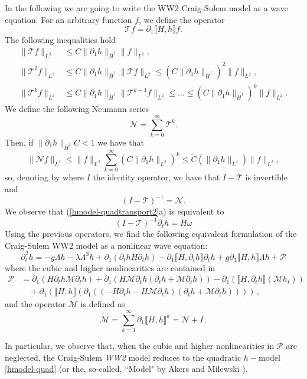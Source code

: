 \documentclass[11pt]{article}
\theoremstyle{plain}
\theoremstyle{definition}
\theoremstyle{definition}
\def\bp{{\partial_1}}
\def\comm#1#2{{\llbracket#1,#2\rrbracket}}
\begin{document}
In the following we are going to write the WW2 Craig-Sulem model as a wave equation. For an arbitrary function $f$, we define the operator
$$
\mathscr{T}f=\partial_1\comm{H}{h}f.
$$
The following inequalities hold
\begin{align*}
\|\mathscr{T}f\|_{L^2}&\leq C\|\partial_1 h\|_{\dot{H}^1}\|f\|_{L^2},\\
\|\mathscr{T}^2f\|_{L^2}&\leq C\|\partial_1 h\|_{\dot{H}^1}\|\mathscr{T}f\|_{L^2}\leq (C\|\partial_1 h\|_{\dot{H}^1})^2\|f\|_{L^2},\\
\|\mathscr{T}^kf\|_{L^2}&\leq C\|\partial_1 h\|_{\dot{H}^1}\|\mathscr{T}^{k-1}f\|_{L^2}\leq...\leq (C\|\partial_1 h\|_{\dot{H}^1})^k\|f\|_{L^2}.
\end{align*}
We define the following Neumann series
$$
\mathscr{N}=\sum_{k=0}^\infty \mathscr{T}^k.
$$
Then, if $\|\partial_1 h\|_{\dot{H}^1}C<1$ we have that
$$
\|\mathscr{N}f\|_{L^2}\leq \|f\|_{L^2}\sum_{k=0}^\infty (C\|\partial_1 h\|_{L^2})^k\leq \widetilde{C}(\|\partial_1 h\|_{L^2})\|f\|_{L^2},
$$
so, denoting by where $I$ the identity operator, we have that $I-\mathscr{T}$ is invertible and
$$
(I-\mathscr{T})^{-1}=\mathscr{N}.
$$
We observe that (\ref{hmodel-quadtransport2}a) is equivalent to
$$
(I-\mathscr{T})^{-1}\partial_t h= H\omega
$$
Using the previous operators, we find the following equivalent formulation of the Craig-Sulem WW2 model as a nonlinear wave equation:
\begin{equation}\label{ww2}
\partial_t^2h= -g\Lambda h-\lambda\Lambda^3 h+\bp(\partial_thH\partial_th)-\bp\comm{H}{\partial_th}\partial_th+g\bp\comm{H}{h}\Lambda h+\mathcal{P}%
\end{equation}
where the cubic and higher nonlinearities are contained in
\begin{align}
\mathcal{P}&=\bp\left(H\partial_th\mathscr{M}\partial_t h\right)+
\bp\left(H\mathscr{M}\partial_th\left(\partial_th+\mathscr{M}\partial_th\right)\right)
-\bp\left(\comm{H}{\partial_th}\left(\mathscr{M}h_t\right)\right)\nonumber\\
&\quad+\bp\left(\comm{H}{h}\left(\bp\left(\left(-H\partial_th-H\mathscr{M}\partial_th\right) \left(\partial_th+\mathscr{M}\partial_th\right)\right)\right)\right)\,,\label{Q}
\end{align}
and the operator $\mathscr{M}$ is defined as
$$
\mathscr{M}=\sum_{k=1}^\infty \bp\comm{H}{h}^k=\mathscr{N}+I\,.
$$


In particular, we observe that, when the cubic and higher nonlinearities in $\mathcal{P}$ are neglected, the Craig-Sulem \emph{WW2} model reduces to the quadratic $h-$model \eqref{hmodel-quad} (or the, so-called, ``Model" by Akers and Milewski \cite{AkMi2010}).
\end{document}
